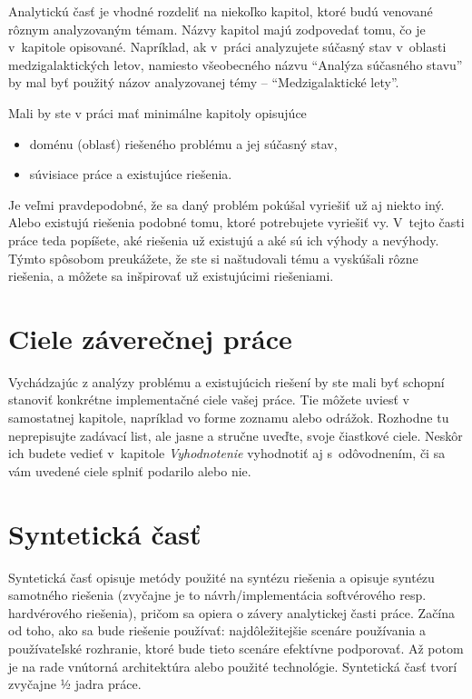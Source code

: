 Analytickú časť je vhodné rozdeliť na niekoľko kapitol, ktoré budú venované rôznym analyzovaným témam. Názvy kapitol majú zodpovedať tomu, čo je v~kapitole opisované. Napríklad, ak v~práci analyzujete súčasný stav v~oblasti medzigalaktických letov, namiesto všeobecného názvu \enquote{Analýza súčasného stavu} by mal byť použitý názov analyzovanej témy -- \enquote{Medzigalaktické lety}.

Mali by ste v práci mať minimálne kapitoly opisujúce
\begin{itemize}
  \item doménu (oblasť) riešeného problému a jej súčasný stav,
  \item súvisiace práce a existujúce riešenia.
\end{itemize}

Je veľmi pravdepodobné, že sa daný problém pokúšal vyriešiť už aj niekto iný. Alebo existujú riešenia podobné tomu, ktoré potrebujete vyriešiť vy. V~tejto časti práce teda popíšete, aké riešenia už existujú a aké sú ich výhody a nevýhody. Týmto spôsobom preukážete, že ste si naštudovali tému a vyskúšali rôzne riešenia, a môžete sa inšpirovať už existujúcimi riešeniami.


\section*{Ciele záverečnej práce}

Vychádzajúc z analýzy problému a existujúcich riešení by ste mali byť schopní stanoviť konkrétne implementačné ciele vašej práce. Tie môžete uviesť v samostatnej kapitole, napríklad vo forme zoznamu alebo odrážok. Rozhodne tu neprepisujte zadávací list, ale jasne a stručne uveďte, svoje čiastkové ciele. Neskôr ich budete vedieť v~kapitole \emph{Vyhodnotenie} vyhodnotiť aj s~odôvodnením, či sa vám uvedené ciele splniť podarilo alebo nie.

\section*{Syntetická časť}

Syntetická časť opisuje metódy použité na syntézu riešenia a opisuje syntézu samotného riešenia (zvyčajne je to návrh/implementácia softvérového resp. hardvérového riešenia), pričom sa opiera o závery analytickej časti práce. Začína od toho, ako sa bude riešenie používať: najdôležitejšie scenáre používania a používateľské rozhranie, ktoré bude tieto scenáre efektívne podporovať. Až potom je na rade vnútorná architektúra alebo použité technológie. Syntetická časť tvorí zvyčajne ½ jadra práce.

